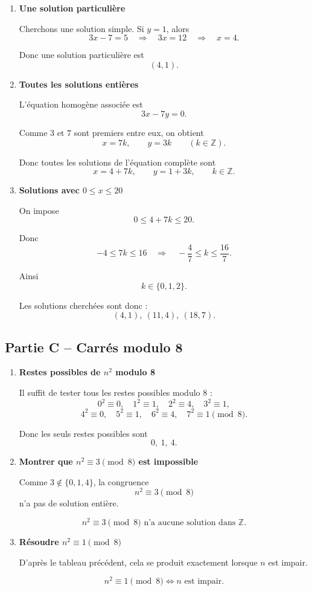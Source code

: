 \documentclass[11pt,a4paper]{article}
\newcommand{\Z}{\mathbb{Z}}
\begin{document}
\begin{enumerate}[label=\textbf{4.\arabic*}, resume, leftmargin=1.6em]

\item \textbf{Une solution particulière}

Cherchons une solution simple. Si \(y=1\), alors
\[
3x-7=5
\quad\Longrightarrow\quad
3x=12
\quad\Longrightarrow\quad
x=4.
\]

Donc une solution particulière est
\[
\boxed{(4,1).}
\]

\item \textbf{Toutes les solutions entières}

L’équation homogène associée est
\[
3x-7y=0.
\]

Comme \(3\) et \(7\) sont premiers entre eux, on obtient
\[
x=7k,\qquad y=3k
\qquad (k\in\Z).
\]

Donc toutes les solutions de l’équation complète sont
\[
\boxed{x=4+7k,\qquad y=1+3k,\qquad k\in\Z.}
\]

\item \textbf{Solutions avec \(0\le x\le 20\)}

On impose
\[
0\le 4+7k\le 20.
\]

Donc
\[
-4\le 7k\le 16
\quad\Longrightarrow\quad
-\frac47\le k\le \frac{16}{7}.
\]

Ainsi
\[
k\in\{0,1,2\}.
\]

Les solutions cherchées sont donc :
\[
\boxed{(4,1),\ (11,4),\ (18,7).}
\]

\end{enumerate}

\subsection*{Partie C -- Carrés modulo 8}

\begin{enumerate}[label=\textbf{4.\arabic*}, resume, leftmargin=1.6em]

\item \textbf{Restes possibles de \(n^2\) modulo 8}

Il suffit de tester tous les restes possibles modulo \(8\) :
\[
0^2\equiv 0,\quad 1^2\equiv 1,\quad 2^2\equiv 4,\quad 3^2\equiv 1,
\]
\[
4^2\equiv 0,\quad 5^2\equiv 1,\quad 6^2\equiv 4,\quad 7^2\equiv 1 \pmod 8.
\]

Donc les seuls restes possibles sont
\[
\boxed{0,\ 1,\ 4.}
\]

\item \textbf{Montrer que \(n^2\equiv 3\pmod 8\) est impossible}

Comme \(3\notin \{0,1,4\}\), la congruence
\[
n^2\equiv 3\pmod 8
\]
n’a pas de solution entière.

\[
\boxed{n^2\equiv 3\pmod 8 \text{ n’a aucune solution dans } \Z.}
\]

\item \textbf{Résoudre \(n^2\equiv 1\pmod 8\)}

D’après le tableau précédent, cela se produit exactement lorsque \(n\) est impair.

\[
\boxed{n^2\equiv 1\pmod 8 \Longleftrightarrow n \text{ est impair}.}
\]

\end{enumerate}
\end{document}
